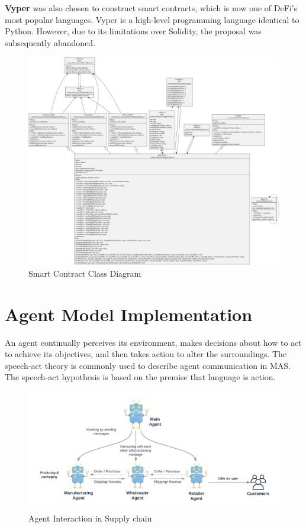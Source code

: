 \vspace{.5cm}

\textbf{Vyper} was also chosen to construct smart contracts, which is now one of \ac{DeFi}'s most popular languages. Vyper is a high-level programming language identical to Python. However, due to its limitations over Solidity, the proposal was subsequently abandoned.


\begin{figure}[!h]
\centering
  \includegraphics[width=21cm, angle=90]{includes/figures/OverallClassDiagram.png} 
  \caption{Smart Contract Class Diagram}
  \label{Overall Class Diagram}
\end{figure}


\section{Agent Model Implementation}

An agent continually perceives its environment, makes decisions about how to act to achieve its objectives, and then takes action to alter the surroundings. The speech-act theory is commonly used to describe agent communication in \ac{MAS}. The speech-act hypothesis is based on the premise that language is action.

\vspace{.5cm}

\begin{figure}[h]
    \centering
      \includegraphics[width=\linewidth]{includes/figures/agent.png} 
      \caption{Agent Interaction in Supply chain}
      \label{Agent Interaction}
    \end{figure}
  
